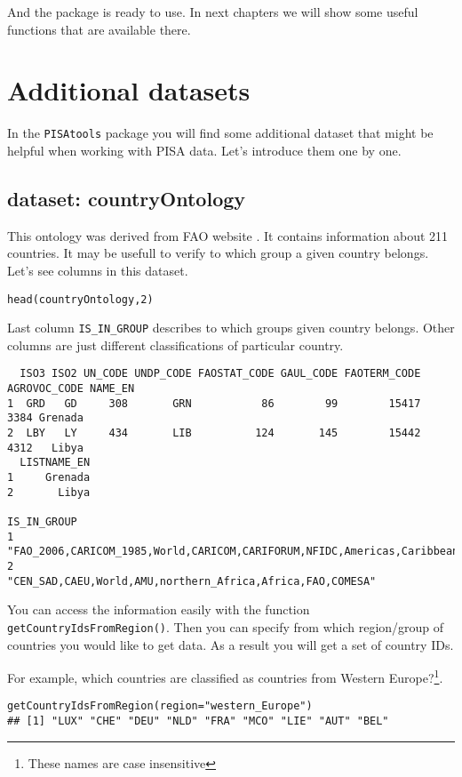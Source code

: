 And the package is ready to use.
In next chapters we will show some useful functions that are available there.

\section{Additional datasets}

In the \verb:PISAtools: package you will find some additional dataset that might be helpful when working with PISA data. Let's introduce them one by one.

\subsection{dataset: countryOntology}
This ontology was derived from FAO website \cite{FAOwebsite}. It contains information about 211 countries. It may be usefull to verify to which group a given country belongs. Let's see columns in this dataset.

\begin{shaded}\begin{verbatim}
head(countryOntology,2)
\end{verbatim}\end{shaded}

Last column \verb:IS_IN_GROUP: describes to which groups given country belongs. Other columns are just different classifications of particular country. 

\begin{shaded}\begin{verbatim}
  ISO3 ISO2 UN_CODE UNDP_CODE FAOSTAT_CODE GAUL_CODE FAOTERM_CODE AGROVOC_CODE NAME_EN
1  GRD   GD     308       GRN           86        99        15417         3384 Grenada
2  LBY   LY     434       LIB          124       145        15442         4312   Libya
  LISTNAME_EN
1     Grenada
2       Libya
                                                                        IS_IN_GROUP
1 "FAO_2006,CARICOM_1985,World,CARICOM,CARIFORUM,NFIDC,Americas,Caribbean,FAO,SIDS"
2                        "CEN_SAD,CAEU,World,AMU,northern_Africa,Africa,FAO,COMESA"
\end{verbatim}\end{shaded}

You can access the information easily with the function \verb:getCountryIdsFromRegion():. Then you can specify from which region/group of countries you would like to get data. As a result you will get a set of country IDs.

For example, which countries are classified as countries from Western Europe?\footnote{These names are case insensitive}.

\begin{shaded}\begin{verbatim}
getCountryIdsFromRegion(region="western_Europe")
## [1] "LUX" "CHE" "DEU" "NLD" "FRA" "MCO" "LIE" "AUT" "BEL"
\end{verbatim}\end{shaded}

